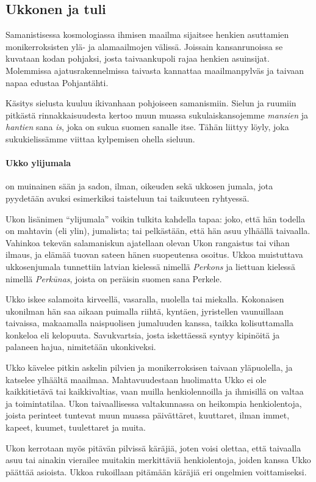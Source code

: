 \subsection{Ukkonen ja tuli}

    Samanistisessa kosmologiassa ihmisen maailma sijaitsee henkien asuttamien monikerroksisten ylä-
    ja alamaailmojen välissä. Joissain kansanrunoissa se kuvataan kodan pohjaksi, josta
    taivaankupoli rajaa henkien asuinsijat. Molemmissa ajatusrakennelmissa taivasta kannattaa
    maailmanpylväs ja taivaan napaa edustaa Pohjantähti.
    \par
    Käsitys sielusta kuuluu ikivanhaan pohjoiseen samanismiin. Sielun ja ruumiin pitkästä
    rinnakkaisuudesta kertoo muun muassa sukulaiskansojemme \emph{mansien} ja \emph{hantien} sana
    \emph{is}, joka on sukua suomen sanalle itse. Tähän liittyy löyly, joka sukukielissämme viittaa
    kylpemisen ohella sieluun.
  \paragraph{Ukko ylijumala} on muinainen sään ja sadon, ilman, oikeuden sekä ukkosen jumala, jota
    pyydetään avuksi esimerkiksi taisteluun tai taikuuteen ryhtyessä.
    \par
    Ukon lisänimen ``ylijumala'' voikin tulkita kahdella tapaa: joko, että hän todella on mahtavin
    (eli ylin), jumalista; tai pelkästään, että hän asuu ylhäällä taivaalla. Vahinkoa tekevän
    salamaniskun ajatellaan olevan Ukon rangaistus tai vihan ilmaus, ja elämää tuovan sateen
    hänen suopeutensa osoitus. Ukkoa muistuttava ukkosenjumala tunnettiin latvian kielessä nimellä
    \emph{Perkons} ja liettuan kielessä nimellä \emph{Perkūnas}, joista on peräisin suomen sana
    Perkele.
    \par
    Ukko iskee salamoita kirveellä, vasaralla, nuolella tai miekalla. Kokonaisen ukonilman hän saa
    aikaan puimalla riihtä, kyntäen, jyristellen vaunuillaan taivaissa, makaamalla naispuolisen
    jumaluuden kanssa, taikka kolisuttamalla konkeloa eli kelopuuta. Savukvartsia, josta
    iskettäessä syntyy kipinöitä ja palaneen hajua, nimitetään ukonkiveksi.
    \par
    Ukko kävelee pitkin askelin pilvien ja monikerroksisen taivaan yläpuolella, ja katselee
    ylhäältä maailmaa. Mahtavuudestaan huolimatta Ukko ei ole kaikkitietävä tai kaikkivaltias, vaan
    muilla henkiolennoilla ja ihmisillä on valtaa ja toimintatilaa. Ukon taivaallisessa
    valtakunnassa on heikompia henkiolentoja, joista perinteet tuntevat muun muassa päivättäret,
    kuuttaret, ilman immet, kapeet, kuumet, tuulettaret ja muita.
    \par
    Ukon kerrotaan myös pitävän pilvissä käräjiä, joten voisi olettaa, että taivaalla asuu tai
    ainakin vierailee muitakin merkittäviä henkiolentoja, joiden kanssa Ukko päättää asioista.
    Ukkoa rukoillaan pitämään käräjiä eri ongelmien voittamiseksi.

